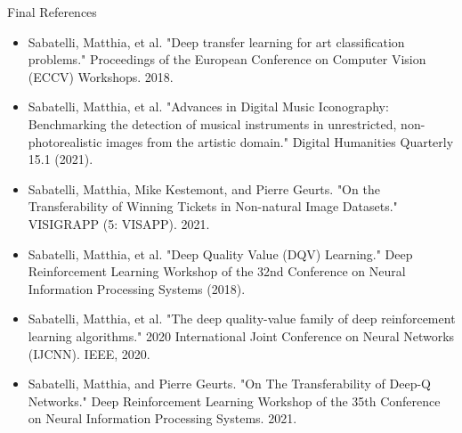 \documentclass{beamer}
\begin{document}
\begin{frame}{Final References}
	\begin{itemize}
		\fontsize{6pt}{7.2}\selectfont
		\item Sabatelli, Matthia, et al. "Deep transfer learning for art classification problems." Proceedings of the European Conference on Computer Vision (ECCV) Workshops. 2018.
		\item Sabatelli, Matthia, et al. "Advances in Digital Music Iconography: Benchmarking the detection of musical instruments in unrestricted, non-photorealistic images from the artistic domain." Digital Humanities Quarterly 15.1 (2021).
		\item Sabatelli, Matthia, Mike Kestemont, and Pierre Geurts. "On the Transferability of Winning Tickets in Non-natural Image Datasets." VISIGRAPP (5: VISAPP). 2021.
		\item Sabatelli, Matthia, et al. "Deep Quality Value (DQV) Learning." Deep Reinforcement Learning Workshop of the 32nd Conference on Neural Information Processing Systems (2018).
		\item Sabatelli, Matthia, et al. "The deep quality-value family of deep reinforcement learning algorithms." 2020 International Joint Conference on Neural Networks (IJCNN). IEEE, 2020.
		\item Sabatelli, Matthia, and Pierre Geurts. "On The Transferability of Deep-Q Networks." Deep Reinforcement Learning Workshop of the 35th Conference on Neural Information Processing Systems. 2021.
	\end{itemize}

\end{frame}

\end{document}
